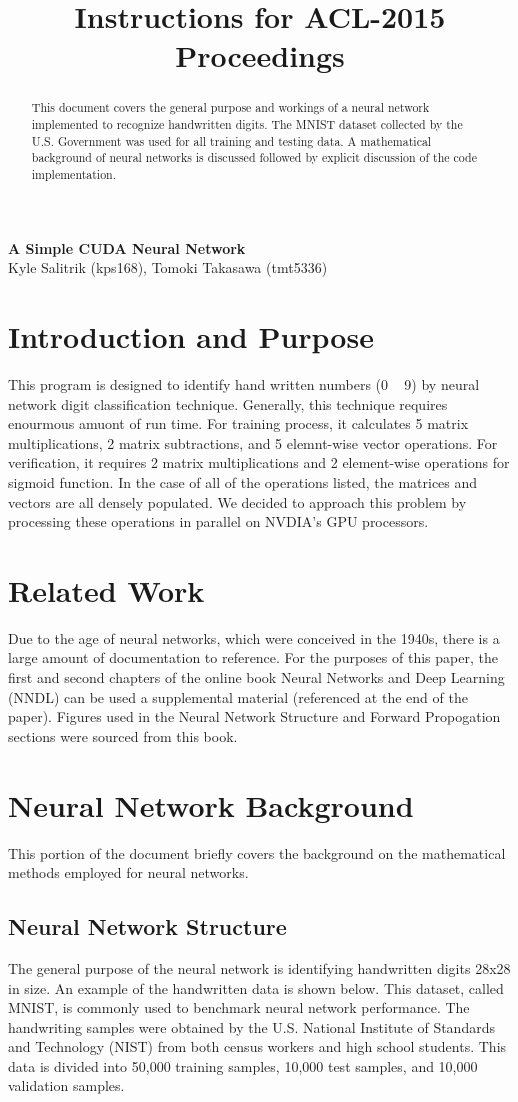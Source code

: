 \documentclass[11pt]{article}
\title{Instructions for ACL-2015 Proceedings}
\begin{document}
\begin{center}
	\textbf{\large{A Simple CUDA Neural Network}}\\
	Kyle Salitrik (kps168), Tomoki Takasawa (tmt5336)
\end{center}
\begin{abstract}
	This document covers the general purpose and workings of a neural network implemented to recognize handwritten digits. The MNIST dataset collected by the U.S. Government was used for all training and testing data. A mathematical background of neural networks is discussed followed by explicit discussion of the code implementation.
\end{abstract}

\section{Introduction and Purpose}
This program is designed to identify hand written numbers (0 ~ 9) by neural network digit classification technique. Generally, this technique requires enourmous amuont of run time. For training process, it calculates 5 matrix multiplications, 2 matrix subtractions, and 5 elemnt-wise vector operations. For verification, it requires 2 matrix multiplications and 2 element-wise operations for sigmoid function. In the case of all of the operations listed, the matrices and vectors are all densely populated. We decided to approach this problem by processing these operations in parallel on NVDIA's GPU processors. 

\section{Related Work}
Due to the age of neural networks, which were conceived in the 1940s, there is a large amount of documentation to reference. For the purposes of this paper, the first and second chapters of the online book Neural Networks and Deep Learning (NNDL) can be used a supplemental material (referenced at the end of the paper). Figures used in the Neural Network Structure and Forward Propogation sections were sourced from this book.

\section{Neural Network Background}
This portion of the document briefly covers the background on the mathematical methods employed for neural networks.

\subsection{Neural Network Structure}
The general purpose of the neural network is identifying handwritten digits 28x28 in size. An example of the handwritten data is shown below. This dataset, called MNIST, is commonly used to benchmark neural network performance. The handwriting samples were obtained by the U.S. National Institute of Standards and Technology (NIST) from both census workers and high school students. This data is divided into 50,000 training samples, 10,000 test samples, and 10,000 validation samples.
\end{document}
